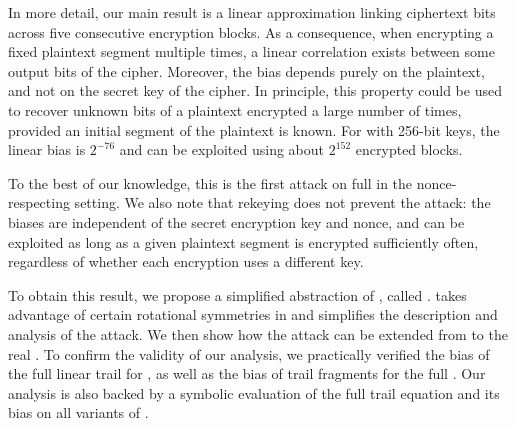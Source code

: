 In more detail, our main result is a linear approximation \cite{eurocryptMatsui93,eurocryptMatsuiY92} linking ciphertext bits across five consecutive encryption blocks.
As a consequence, when encrypting a fixed plaintext segment multiple times, a linear correlation exists between some output bits of the cipher.
Moreover, the bias depends purely on the plaintext, and not on the secret key of the cipher.
In principle, this property could be used to recover unknown bits of a plaintext encrypted a large number of times, provided an initial segment of the plaintext is known.
For \MORUS[1280] with 256-bit keys, the linear bias is $2^{-76}$
and can be exploited using about $2^{152}$ encrypted blocks.

To the best of our knowledge, this is the first attack on full \MORUS in the nonce-respecting setting.
We also note that rekeying does not prevent the attack: the biases are independent of the secret encryption key and nonce, and can be exploited as long as a given plaintext segment is encrypted sufficiently often, regardless of whether each encryption uses a different key.

To obtain this result, we propose a simplified abstraction of \MORUS, called \MiniMORUS. \MiniMORUS takes advantage of certain rotational symmetries in \MORUS and simplifies the description and analysis of the attack. We then show how the attack can be extended from \MiniMORUS to the real \MORUS.
To confirm the validity of our analysis,
we practically verified the bias of the full linear trail for \MiniMORUS, as well as the bias of trail fragments for the full \MORUS.
Our analysis is also backed by a symbolic evaluation of the full trail equation and its bias on all variants of \MORUS.

